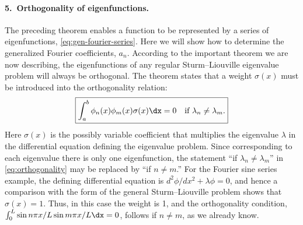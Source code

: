 \paragraph{5.\ Orthogonality of eigenfunctions.}
The preceding theorem enables a function to be represented by a series of eigenfunctions, \eqref{eq:gen-fourier-series}.  Here we will show how to determine the generalized Fourier coefficients, $a_n$.  According to the important theorem we are now describing, the eigenfunctions of any regular Sturm--Liouville eigenvalue problem will always be orthogonal.  The theorem states that a weight $\sigma(x)$ must be introduced into the orthogonality relation:
\begin{equation}
\label{eq:orthogonality}
\boxed{\int_a^b \phi_n(x)\phi_m(x)\sigma(x)\dx = 0 \quad \text{if } \lambda_n \neq \lambda_m.}
\end{equation}
Here $\sigma(x)$ is the possibly variable coefficient that multiplies the eigenvalue $\lambda$ in the differential equation defining the eigenvalue problem.  Since corresponding to each eigenvalue there is only one eigenfunction, the statement ``if $\lambda_n \neq \lambda_m$'' in \eqref{eq:orthogonality} may be replaced by ``if $n \neq m$.''  For the Fourier sine series example, the defining differential equation is $d^2\phi/dx^2 + \lambda\phi = 0$, and hence a comparison with the form of the general Sturm--Liouville problem shows that $\sigma(x) = 1$.  Thus, in this case the weight is 1, and the orthogonality condition, $\int_0^L \sin n\pi x/L \sin m\pi x/L\dx = 0$, follows if $n \neq m$, as we already know.

